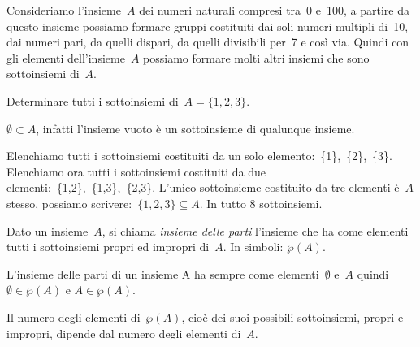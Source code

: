 Consideriamo l'insieme~\(A\) dei numeri naturali
compresi tra~0 e~100, a partire da questo insieme possiamo formare
gruppi costituiti dai soli numeri multipli di~10, dai numeri pari, da
quelli dispari, da quelli divisibili per~7 e così via. Quindi con gli
elementi dell'insieme~\(A\) possiamo formare molti
altri insiemi che sono sottoinsiemi di~\(A\).

\begin{exrig}
 \begin{esempio}
Determinare tutti i sottoinsiemi di~\(A=\{1,2,3\}\).

\(\emptyset \subset A\), infatti l'insieme vuoto è un
sottoinsieme di qualunque insieme.

Elenchiamo tutti i sottoinsiemi costituiti da un solo 
elemento:~\{1\},~\{2\},~\{3\}.
Elenchiamo ora tutti i sottoinsiemi costituiti da due 
elementi:~\{1,2\},~\{1,3\},~\{2,3\}.
L'unico sottoinsieme costituito da tre elementi è~\(A\) stesso, possiamo 
scrivere:~\(\{1,2,3\}\subseteq A\). In tutto 8 sottoinsiemi.
 \end{esempio}

\end{exrig}

\begin{definizione}
Dato un insieme~\(A\), si chiama \emph{insieme delle parti} l'insieme che 
ha come elementi tutti i sottoinsiemi propri ed impropri di~\(A\). 
In simboli: \(\wp (A)\).
\end{definizione}

L'insieme delle parti di un insieme A ha sempre come
elementi~\(\emptyset \) e~\(A\) quindi~\(\emptyset\in\wp (A)\) e
\(A\in\wp (A)\).

Il numero degli elementi di~\(\wp (A)\), cioè dei suoi possibili
sottoinsiemi, propri e impropri, dipende dal numero degli elementi di~\(A\).

